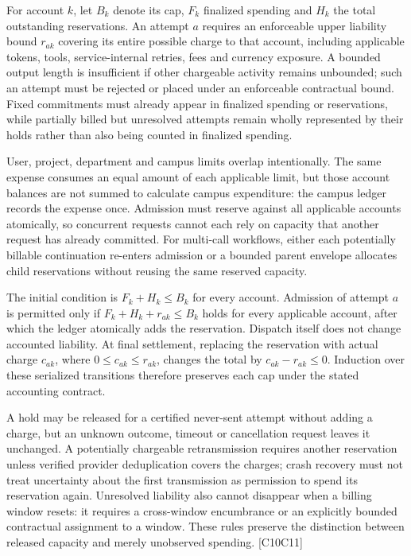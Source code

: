 \documentclass[11pt]{article}
\begin{document}
For account $k$, let $B_k$ denote its cap, $F_k$ finalized spending and $H_k$ the total outstanding reservations. An attempt $a$ requires an enforceable upper liability bound $r_{ak}$ covering its entire possible charge to that account, including applicable tokens, tools, service-internal retries, fees and currency exposure. A bounded output length is insufficient if other chargeable activity remains unbounded; such an attempt must be rejected or placed under an enforceable contractual bound. Fixed commitments must already appear in finalized spending or reservations, while partially billed but unresolved attempts remain wholly represented by their holds rather than also being counted in finalized spending.

User, project, department and campus limits overlap intentionally. The same expense consumes an equal amount of each applicable limit, but those account balances are not summed to calculate campus expenditure: the campus ledger records the expense once. Admission must reserve against all applicable accounts atomically, so concurrent requests cannot each rely on capacity that another request has already committed. For multi-call workflows, either each potentially billable continuation re-enters admission or a bounded parent envelope allocates child reservations without reusing the same reserved capacity.

The initial condition is $F_k+H_k\leq B_k$ for every account. Admission of attempt $a$ is permitted only if $F_k+H_k+r_{ak}\leq B_k$ holds for every applicable account, after which the ledger atomically adds the reservation. Dispatch itself does not change accounted liability. At final settlement, replacing the reservation with actual charge $c_{ak}$, where $0\leq c_{ak}\leq r_{ak}$, changes the total by $c_{ak}-r_{ak}\leq0$. Induction over these serialized transitions therefore preserves each cap under the stated accounting contract.

A hold may be released for a certified never-sent attempt without adding a charge, but an unknown outcome, timeout or cancellation request leaves it unchanged. A potentially chargeable retransmission requires another reservation unless verified provider deduplication covers the charges; crash recovery must not treat uncertainty about the first transmission as permission to spend its reservation again. Unresolved liability also cannot disappear when a billing window resets: it requires a cross-window encumbrance or an explicitly bounded contractual assignment to a window. These rules preserve the distinction between released capacity and merely unobserved spending. [C10\textendash{}\allowbreak{}C11]
\end{document}

